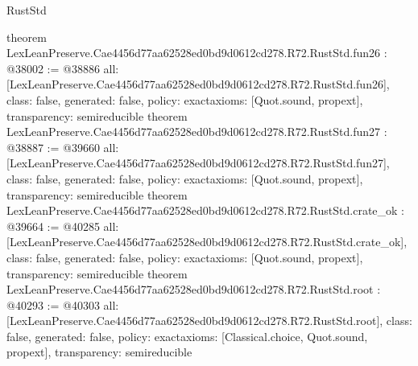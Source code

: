 \begin{lexlean}{RustStd}
\begin{coremodule}
{}
theorem LexLeanPreserve.Cae4456d77aa62528ed0bd9d0612cd278.R72.RustStd.fun26 : @38002 := @38886 {
  all: [LexLeanPreserve.Cae4456d77aa62528ed0bd9d0612cd278.R72.RustStd.fun26],
  class: false,
  generated: false,
  policy: exact{axioms: [Quot.sound, propext]},
  transparency: semireducible
}
theorem LexLeanPreserve.Cae4456d77aa62528ed0bd9d0612cd278.R72.RustStd.fun27 : @38887 := @39660 {
  all: [LexLeanPreserve.Cae4456d77aa62528ed0bd9d0612cd278.R72.RustStd.fun27],
  class: false,
  generated: false,
  policy: exact{axioms: [Quot.sound, propext]},
  transparency: semireducible
}
theorem LexLeanPreserve.Cae4456d77aa62528ed0bd9d0612cd278.R72.RustStd.crate_ok : @39664 := @40285 {
  all: [LexLeanPreserve.Cae4456d77aa62528ed0bd9d0612cd278.R72.RustStd.crate_ok],
  class: false,
  generated: false,
  policy: exact{axioms: [Quot.sound, propext]},
  transparency: semireducible
}
theorem LexLeanPreserve.Cae4456d77aa62528ed0bd9d0612cd278.R72.RustStd.root : @40293 := @40303 {
  all: [LexLeanPreserve.Cae4456d77aa62528ed0bd9d0612cd278.R72.RustStd.root],
  class: false,
  generated: false,
  policy: exact{axioms: [Classical.choice, Quot.sound, propext]},
  transparency: semireducible
}


\end{coremodule}
\end{lexlean}
